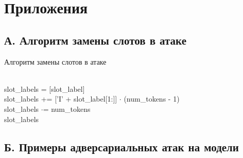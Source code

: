 \section*{Приложения}

\subsection*{А. Алгоритм замены слотов в атаке}

\begin{algorithm}
    \caption{Алгоритм замены слотов в атаке}
    \begin{algorithmic}
            \\
            \ind slot\_labels = [slot\_label]
            \ind{}
                    \ind\ind{}
                                \\
                                \ind\ind\ind slot\_labels += ['I' + slot\_label[1:]] $\cdot$ (num\_tokens - 1)
                    \Else
                                \\
                                \ind\ind\ind slot\_labels $\cdot$= num\_tokens
                    \EndIf
            \EndIf \\
            \ind\Return slot\_labels
        \EndFunction
    \end{algorithmic}\label{alg:algorithm3}
\end{algorithm}

\subsection*{Б. Примеры адверсариальных атак на модели}



